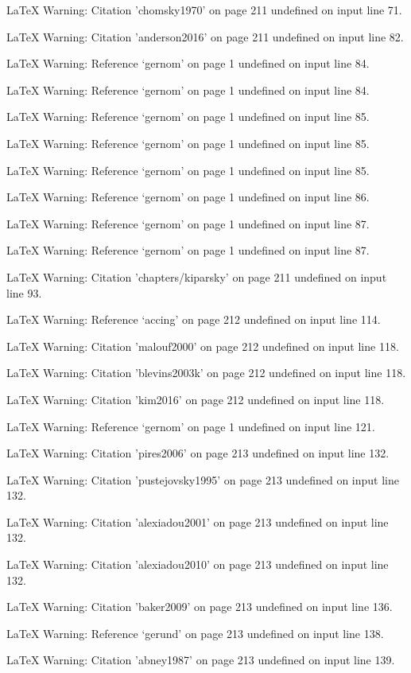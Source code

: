 LaTeX Warning: Citation 'chomsky1970' on page 211 undefined on input line 71.


LaTeX Warning: Citation 'anderson2016' on page 211 undefined on input line 82.


LaTeX Warning: Reference `gernom' on page 1 undefined on input line 84.


LaTeX Warning: Reference `gernom' on page 1 undefined on input line 84.


LaTeX Warning: Reference `gernom' on page 1 undefined on input line 85.


LaTeX Warning: Reference `gernom' on page 1 undefined on input line 85.


LaTeX Warning: Reference `gernom' on page 1 undefined on input line 85.


LaTeX Warning: Reference `gernom' on page 1 undefined on input line 86.


LaTeX Warning: Reference `gernom' on page 1 undefined on input line 87.


LaTeX Warning: Reference `gernom' on page 1 undefined on input line 87.


LaTeX Warning: Citation 'chapters/kiparsky' on page 211 undefined on input line 93.


LaTeX Warning: Reference `accing' on page 212 undefined on input line 114.


LaTeX Warning: Citation 'malouf2000' on page 212 undefined on input line 118.


LaTeX Warning: Citation 'blevins2003k' on page 212 undefined on input line 118.


LaTeX Warning: Citation 'kim2016' on page 212 undefined on input line 118.


LaTeX Warning: Reference `gernom' on page 1 undefined on input line 121.


LaTeX Warning: Citation 'pires2006' on page 213 undefined on input line 132.


LaTeX Warning: Citation 'pustejovsky1995' on page 213 undefined on input line 132.


LaTeX Warning: Citation 'alexiadou2001' on page 213 undefined on input line 132.


LaTeX Warning: Citation 'alexiadou2010' on page 213 undefined on input line 132.


LaTeX Warning: Citation 'baker2009' on page 213 undefined on input line 136.


LaTeX Warning: Reference `gerund' on page 213 undefined on input line 138.


LaTeX Warning: Citation 'abney1987' on page 213 undefined on input line 139.


